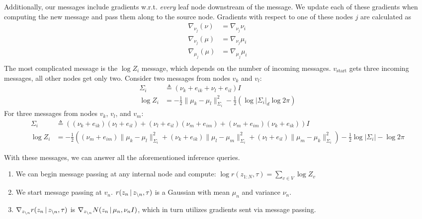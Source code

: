 Additionally, our messages include gradients w.r.t. \emph{every} leaf node
downstream of the message.
We update each of these gradients when computing the new message
and pass them along to the source node.
Gradients with respect to one of these nodes $j$ are calculated as
\begin{equation}
\begin{split}
    \nabla_{\nu_j}(\nu) &= \nabla_{\nu_j} \nu_i\\
    \nabla_{\nu_j}(\mu) &= \nabla_{\nu_j} \mu_i\\
    \nabla_{\mu_j}(\mu) &= \nabla_{\mu_j} \mu_i\\
\end{split}
\end{equation}
The most complicated message is the $\log Z_i$ message, which depends
on the number of incoming messages. $v_{\text{start}}$ gets
three incoming messages,
all other nodes get only two. Consider
two messages from nodes $v_k$ and $v_l$:
\begin{equation}
\begin{split}
    \Sigma_i &\triangleq (\nu_k + e_{ik} + \nu_l + e_{il})I \\
    \log Z_i &= -\frac{1}{2}\|\mu_k - \mu_l\|^2_{\Sigma_i} - \frac{1}{2}\left(\log|\Sigma_i| _ d\log2\pi\right)
\end{split}
\end{equation}
For three messages from nodes
$v_k$, $v_l$, and $v_m$:
\begin{equation}
\begin{split}
    \Sigma_i &\triangleq \left((\nu_k + e_{ik})(\nu_l + e_{il}) + (\nu_l + e_{il})(\nu_m + e_{im}) + (\nu_m + e_{im})(\nu_k + e_{ik})\right)I \\
    \log Z_i &= -\frac{1}{2}\left((\nu_m + e_{im})\|\mu_k - \mu_l\|^2_{\Sigma_i} + (\nu_k + e_{ik})\|\mu_l - \mu_m\|^2_{\Sigma_i} + (\nu_l + e_{il})\|\mu_m - \mu_k\|^2_{\Sigma_i}\right) - \frac{1}{2}\log|\Sigma_i| - \log2\pi
\end{split}
\end{equation}

With these messages, we can answer all the aforementioned inference queries.
\begin{enumerate}
    \item We can begin message passing at any internal node and compute: $\log r(z_{1:N}, \tau) = \sum_{v \in V} \log Z_v$
    \item We start message passing at $v_n$. $r(z_n \,|\, z_{\backslash n}, \tau)$ is a Gaussian with mean $\mu_n$ and variance $\nu_n$.
    \item $\nabla_{z_{\backslash n}} r(z_n \,|\, z_{\backslash n}, \tau)$ is $\nabla_{z_{\backslash n}} N(z_n \,|\, \mu_n, \nu_n I)$,
    which in turn utilizes gradients sent via message passing.
\end{enumerate}

